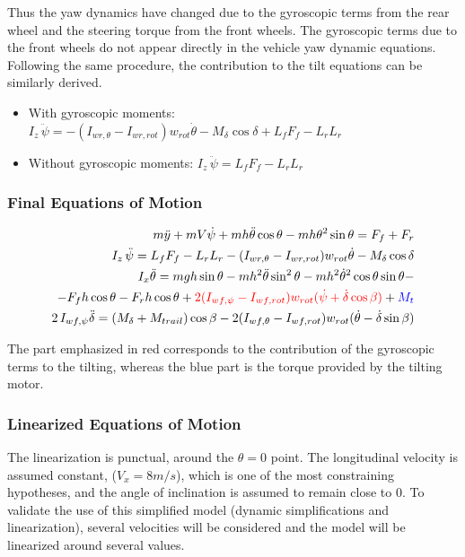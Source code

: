 Thus the yaw dynamics have changed due to the gyroscopic terms from the rear wheel and the steering torque from the front wheels. The gyroscopic terms due to the front wheels do not appear directly in the vehicle yaw dynamic equations. Following the same procedure, the contribution to the tilt equations can be similarly derived.
\begin{itemize}
\begin{itemize}
\item With gyroscopic moments:\\$I_{z}\,\ddot{\psi}=-(I_{wr,\theta}-I_{wr,rot})w_{rot}\dot{\theta}-M_{\delta}\cos\delta+L_{f}F_{f}-L_{r}L_{r}$
\item Without gyroscopic moments: $I_{z}\,\ddot{\psi}=L_{f}F_{f}-L_{r}L_{r}$
\end{itemize}
\end{itemize}

\subsubsection{\textbf{Final Equations of Motion}}
\begin{eqnarray}
m\ddot{y}+mV \dot{\psi}+mh\ddot{\theta}\cos\theta - mh\theta^2\sin\theta=F_{f}+F_{r} \\
I_{z}\,\ddot{\psi}=L_{f}F_{f}-L_{r}L_{r}-(I_{wr,\theta}-I_{wr,rot})w_{rot}\dot{\theta}-M_{\delta}\cos\delta\\
I_{x} \ddot{\theta}=mgh\sin\theta - mh^2\ddot{\theta}\sin^2\theta - mh^2\dot{\theta}^2\cos\theta\sin\theta -\notag\\
-F_{f}h\cos\theta-F_{r}h\cos\theta +\textcolor{red}{2(I_{wf,\psi}-I_{wf,rot})w_{rot}(\dot{\psi}+\dot{\delta}\cos\beta)} + \textcolor{blue}{M_{t}}\\
2\,I_{wf,\psi}\ddot{\delta}=(M_{\delta}+M_{trail})\cos\beta-2(I_{wf,\theta}-I_{wf,rot})w_{rot}(\dot{\theta}-\dot{\delta}\sin\beta)
\end{eqnarray}

The part emphasized in red corresponds to the contribution of the gyroscopic terms to the tilting, whereas the blue part is the torque provided by the tilting motor.

\subsubsection{\textbf{Linearized Equations of Motion}}

The linearization is punctual, around the $\theta=0$ point. The longitudinal velocity is assumed constant, ($V_{x} = 8 m/s$), which is one of the most constraining hypotheses, and the angle of inclination is assumed to remain close to 0. To validate the use of this simplified model (dynamic simplifications and linearization), several velocities will be considered and the model will be linearized around several values.

